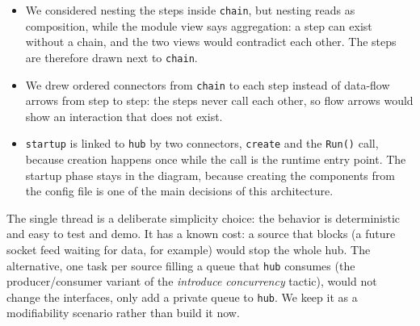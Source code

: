 \documentclass[../main-en.tex]{subfiles}
\begin{document}
\begin{itemize}
  \item We considered nesting the steps inside \texttt{chain}, but nesting
  reads as composition, while the module view says aggregation: a step can
  exist without a chain, and the two views would contradict each other. The
  steps are therefore drawn next to \texttt{chain}.
  \item We drew ordered connectors from \texttt{chain} to each step instead
  of data-flow arrows from step to step: the steps never call each other,
  so flow arrows would show an interaction that does not exist.
  \item \texttt{startup} is linked to \texttt{hub} by two connectors,
  \texttt{create} and the \texttt{Run()} call, because creation happens
  once while the call is the runtime entry point. The startup phase stays
  in the diagram, because creating the components from the config file is
  one of the main decisions of this architecture.
\end{itemize}

The single thread is a deliberate simplicity choice: the behavior is
deterministic and easy to test and demo. It has a known cost: a source that
blocks (a future socket feed waiting for data, for example) would stop the
whole hub. The alternative, one task per source filling a queue that
\texttt{hub} consumes (the producer/consumer variant of the \emph{introduce
concurrency} tactic), would not change the interfaces, only add a private
queue to \texttt{hub}. We keep it as a modifiability scenario rather than
build it now.
\end{document}

